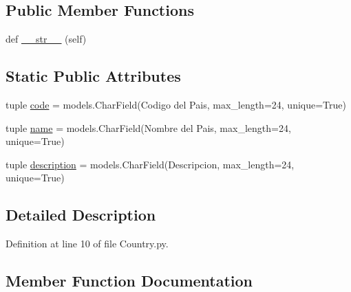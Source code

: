 \subsection*{Public Member Functions}
\begin{DoxyCompactItemize}
\item 
def \hyperlink{class_ground_segment_1_1models_1_1_country_1_1_country_aa26ba811fa102154aa023bb91f627a6f}{\+\_\+\+\_\+str\+\_\+\+\_\+} (self)
\end{DoxyCompactItemize}
\subsection*{Static Public Attributes}
\begin{DoxyCompactItemize}
\item 
tuple \hyperlink{class_ground_segment_1_1models_1_1_country_1_1_country_ae2c407a19511858333cecb12efa8679c}{code} = models.\+Char\+Field(\textquotesingle{}Codigo del Pais\textquotesingle{}, max\+\_\+length=24, unique=True)
\item 
tuple \hyperlink{class_ground_segment_1_1models_1_1_country_1_1_country_a8269e1fb0841c68c00621be021128abc}{name} = models.\+Char\+Field(\textquotesingle{}Nombre del Pais\textquotesingle{}, max\+\_\+length=24, unique=True)
\item 
tuple \hyperlink{class_ground_segment_1_1models_1_1_country_1_1_country_a0d607922e087ee8fcc8e54df0ff1a75f}{description} = models.\+Char\+Field(\textquotesingle{}Descripcion\textquotesingle{}, max\+\_\+length=24, unique=True)
\end{DoxyCompactItemize}


\subsection{Detailed Description}


Definition at line 10 of file Country.\+py.



\subsection{Member Function Documentation}
\hypertarget{class_ground_segment_1_1models_1_1_country_1_1_country_aa26ba811fa102154aa023bb91f627a6f}{}
